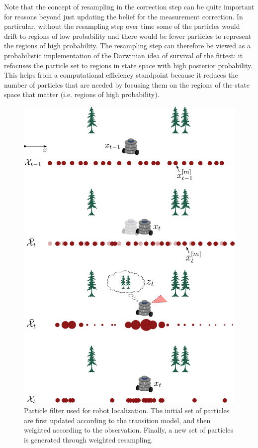 Note that the concept of resampling in the correction step can be quite important for reasons beyond just updating the belief for the measurement correction. In particular, without the resampling step over time some of the particles would drift to regions of low probability and there would be fewer particles to represent the regions of high probability. The resampling step can therefore be viewed as a probabilistic implementation of the Darwinian idea of survival of the fittest: it refocuses the particle set to regions in state space with high posterior probability. This helps from a computational efficiency standpoint because it reduces the number of particles that are needed by focusing them on the regions of the state space that matter (i.e. regions of high probability).
\begin{figure}[ht]
\centering
\includegraphics[width=0.8\linewidth]{tex/figs/ch15_figs/particlefilter.png}
\caption{Particle filter used for robot localization. The initial set of particles are first updated according to the transition model, and then weighted according to the observation. Finally, a new set of particles is generated through weighted resampling.}
\label{fig:Particle_filter}
\end{figure}

